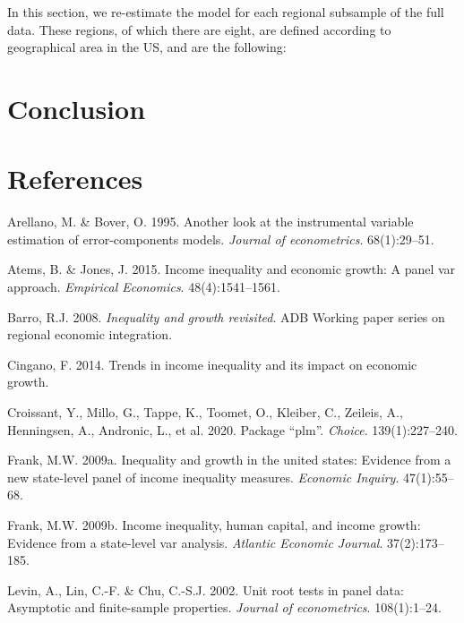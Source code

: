 \documentclass[11pt,preprint, authoryear]{elsarticle}
\numberwithin{equation}{section}
\numberwithin{figure}{section}
\numberwithin{table}{section}
\begin{document}
In this section, we re-estimate the model for each regional subsample of
the full data. These regions, of which there are eight, are defined
according to geographical area in the US, and are the following:

\hypertarget{conclusion}{%
\section{\texorpdfstring{Conclusion
\label{Section 4}}{Conclusion }}\label{conclusion}}

\newpage

\hypertarget{references}{%
\section*{References}\label{references}}

\hypertarget{refs}{}
\leavevmode\hypertarget{ref-arellano}{}%
Arellano, M. \& Bover, O. 1995. Another look at the instrumental
variable estimation of error-components models. \emph{Journal of
econometrics}. 68(1):29--51.

\leavevmode\hypertarget{ref-atems}{}%
Atems, B. \& Jones, J. 2015. Income inequality and economic growth: A
panel var approach. \emph{Empirical Economics}. 48(4):1541--1561.

\leavevmode\hypertarget{ref-barro}{}%
Barro, R.J. 2008. \emph{Inequality and growth revisited}. ADB Working
paper series on regional economic integration.

\leavevmode\hypertarget{ref-cingano}{}%
Cingano, F. 2014. Trends in income inequality and its impact on economic
growth.

\leavevmode\hypertarget{ref-croissant2020package}{}%
Croissant, Y., Millo, G., Tappe, K., Toomet, O., Kleiber, C., Zeileis,
A., Henningsen, A., Andronic, L., et al. 2020. Package ``plm''.
\emph{Choice}. 139(1):227--240.

\leavevmode\hypertarget{ref-frank}{}%
Frank, M.W. 2009a. Inequality and growth in the united states: Evidence
from a new state-level panel of income inequality measures.
\emph{Economic Inquiry}. 47(1):55--68.

\leavevmode\hypertarget{ref-frankincome}{}%
Frank, M.W. 2009b. Income inequality, human capital, and income growth:
Evidence from a state-level var analysis. \emph{Atlantic Economic
Journal}. 37(2):173--185.

\leavevmode\hypertarget{ref-levin}{}%
Levin, A., Lin, C.-F. \& Chu, C.-S.J. 2002. Unit root tests in panel
data: Asymptotic and finite-sample properties. \emph{Journal of
econometrics}. 108(1):1--24.
\end{document}
